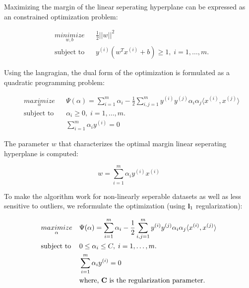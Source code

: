 \documentclass{article}
\begin{document}
		Maximizing the margin of the linear seperating hyperplane can be expressed as an constrained optimization problem:
		
		\begin{equation*}
			\begin{aligned}
				& \underset{w, b}{minimize}
				& & \frac{1}{2} ||w||^2 \\
				& \text{subject to}
				& & y^{(i)}(w^Tx^{(i)}+b) \geq 1, \; i = 1, \ldots, m.
			\end{aligned}
		\end{equation*}
		
		Using the langragian, the dual form of the optimization is formulated as a quadratic programming problem:
		
		\begin{equation*}
			\begin{aligned}
				& \underset{\alpha}{maximize}
				& & \Psi(\alpha) = \sum_{i=1}^{m} \alpha_i - \frac{1}{2} \sum_{i,j=1}^{m} y^{(i)} y^{(j)} \alpha_i \alpha_j \langle x^{(i)}, x^{(j)} \rangle \\
				& \text{subject to}
				& & \alpha_i \geq 0, \; i=1, \ldots, m. \\
				& & & \sum_{i=1}^{m} \alpha_i y^{(i)} = 0								
			\end{aligned}					
		\end{equation*}
		
		The parameter $w$ that characterizes the optimal margin linear seperating hyperplane is computed:
		
		\begin{equation*}
			w = \sum_{i=1}^{m} \alpha_i y^{(i)} x^{(i)}
		\end{equation*}
				
		To make the algorithm work for non-linearly seperable datasets as well as less sensitive to outliers, we reformulate the optimization (using ${\textbf l_1}$ regularization):
		
		\begin{equation}
			\label{regularised_dual_form}
			\begin{aligned}
				& \underset{\alpha}{maximize}
				& & \Psi(\alpha) = \sum_{i=1}^{m} \alpha_i - \frac{1}{2} \sum_{i,j=1}^{m} y^{(i)} y^{(j)} \alpha_i \alpha_j \langle x^{(i)}, x^{(j)} \rangle \\
				& \text{subject to}
				& & 0 \leq \alpha_i \leq C, \; i=1, \ldots, m. \\
				& & & \sum_{i=1}^{m} \alpha_i y^{(i)} = 0 \\
				& & & \text{where, \textbf{C} is the regularization parameter.}
			\end{aligned}					
		\end{equation}		
		
\end{document}
